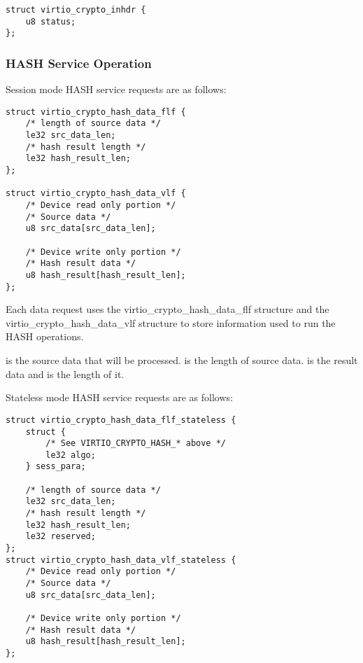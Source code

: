 \begin{lstlisting}
struct virtio_crypto_inhdr {
    u8 status;
};
\end{lstlisting}

\subsubsection{HASH Service Operation}\label{sec:Device Types / Crypto Device / Device Operation / HASH Service Operation}

Session mode HASH service requests are as follows:

\begin{lstlisting}
struct virtio_crypto_hash_data_flf {
    /* length of source data */
    le32 src_data_len;
    /* hash result length */
    le32 hash_result_len;
};

struct virtio_crypto_hash_data_vlf {
    /* Device read only portion */
    /* Source data */
    u8 src_data[src_data_len];

    /* Device write only portion */
    /* Hash result data */
    u8 hash_result[hash_result_len];
};
\end{lstlisting}

Each data request uses the virtio_crypto_hash_data_flf structure and the
virtio_crypto_hash_data_vlf structure to store information used to run the
HASH operations.

 is the source data that will be processed.
 is the length of source data.
 is the result data and  is the length
of it.

Stateless mode HASH service requests are as follows:

\begin{lstlisting}
struct virtio_crypto_hash_data_flf_stateless {
    struct {
        /* See VIRTIO_CRYPTO_HASH_* above */
        le32 algo;
    } sess_para;

    /* length of source data */
    le32 src_data_len;
    /* hash result length */
    le32 hash_result_len;
    le32 reserved;
};
struct virtio_crypto_hash_data_vlf_stateless {
    /* Device read only portion */
    /* Source data */
    u8 src_data[src_data_len];

    /* Device write only portion */
    /* Hash result data */
    u8 hash_result[hash_result_len];
};
\end{lstlisting}


